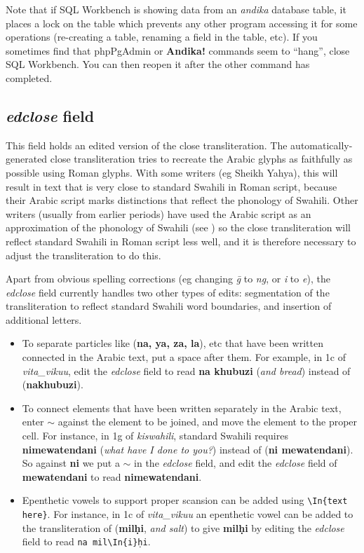 Note that if SQL Workbench is showing data from an \textit{andika} database table, it places a lock on the table which prevents any other program accessing it for some operations (re-creating a table, renaming a field in the table, etc).  If you sometimes find that phpPgAdmin or \textbf{Andika!} commands seem to ``hang'', close SQL Workbench.  You can then reopen it after the other command has completed.


\subsection{\textit{edclose} field}

This field holds an edited version of the close transliteration.  The automatically-generated close transliteration tries to recreate the Arabic glyphs as faithfully as possible using Roman glyphs.  With some writers (eg Sheikh Yahya), this will result in text that is very close to standard Swahili in Roman script, because their Arabic script marks distinctions that reflect the phonology of Swahili.  Other writers (usually from earlier periods) have used the Arabic script as an approximation of the  phonology of Swahili (see ) so the close transliteration will reflect standard Swahili in Roman script less well, and it is therefore necessary to adjust the transliteration to do this.

Apart from obvious spelling corrections (eg changing \textit{ḡ} to \textit{ng}, or \textit{i} to \textit{e}), the \textit{edclose} field currently handles two other types of edits: segmentation of the transliteration to reflect standard Swahili word boundaries, and insertion of additional letters.
\begin{itemize}
\item To separate particles like  (\textbf{na, ya, za, la}), etc that have been written connected in the Arabic text, put a space after them.  For example, in 1c of \textit{vita_vikuu}, edit the \textit{edclose} field to read \textbf{na khubuzi} (\textit{and bread}) instead of  (\textbf{nakhubuzi}).
\item To connect elements that have been written separately in the Arabic text, enter $\sim$ against the element to be joined, and move the element to the proper cell.  For instance, in 1g of \textit{kiswahili}, standard Swahili requires \textbf{nimewatendani} (\textit{what have I done to you?}) instead of  (\textbf{ni mewatendani}).  So against \textbf{ni} we put a $\sim$ in the \textit{edclose} field, and edit the \textit{edclose} field of \textbf{mewatendani} to read \textbf{nimewatendani}.
\item Epenthetic vowels to support proper scansion can be added using \verb|\In{text here}|.  For instance, in 1c of \textit{vita_vikuu} an epenthetic vowel can be added to the transliteration of  (\textbf{milḥi}, \textit{and salt}) to give \textbf{milḥi} by editing the \textit{edclose} field to read \verb|na mil\In{i}ḥi|.
\end{itemize}


